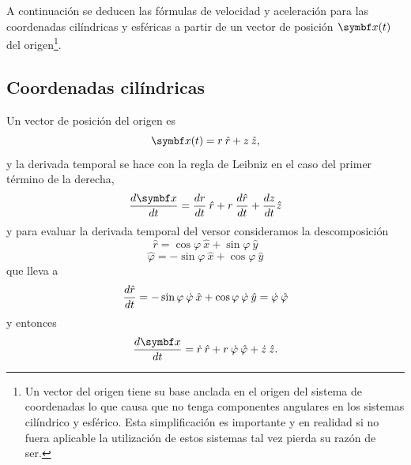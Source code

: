 \documentclass[10pt,oneside]{CBFT_book}
\begin{document}
A continuación se deducen las fórmulas de velocidad y aceleración para las coordenadas cilíndricas y esféricas a partir de
un vector de posición $ \vb{x}(t) $ del origen\footnote{Un vector del origen tiene su base anclada en el origen del sistema
de coordenadas lo que causa que no tenga componentes angulares en los sistemas cilíndrico y esférico. Esta simplificación
es importante y en realidad si no fuera aplicable la utilización de estos sistemas tal vez pierda su razón de ser.}.


\subsection{Coordenadas cilíndricas}

Un vector de posición del origen es 
\[
	\vb{x}(t) = r \:\hat{r} + z \:\hat{z},
\]
y la derivada temporal se hace con la regla de Leibniz en el caso del primer término de la derecha, 
\[
	\dtot{\vb{x}}{t} = \dtot{r}{t} \:\hat{r} + r \:\dtot{\hat{r}}{t} + \dtot{z}{t} \hat{z}
\]
y para evaluar la derivada temporal del versor consideramos la descomposición 
\[
	\hat{r} = \cos \varphi \:\hat{x} + \sin \varphi \:\hat{y}
\]
\[
	\hat{\varphi} = -\sin \varphi  \:\hat{x} + \cos  \varphi \:\hat{y}
\]
que lleva a 
\[
	\frac{d^{\hspace{-0.05em}} {\hat{r}}}{d {t}^{\hspace{-0.05em}}} = - \sin \varphi \: \dot{ \varphi } \:\hat{x} + \cos \varphi \: \dot{ \varphi } \:\hat{y} =
	\dot{\varphi} \: \hat{\varphi}
\]
y entonces 
\[
	\dtot{\vb{x}}{t} = \dot{r} \:\hat{r } + r \:\dot{\vp} \: \hat{\vp} + \dot{z} \:\hat{z}.
\]
\end{document}
